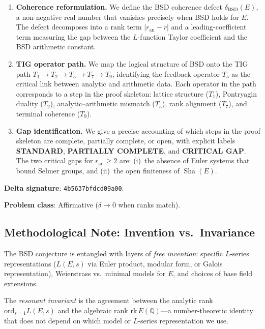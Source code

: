 \documentclass[11pt]{article}
\DeclareMathOperator{\Sha}{Sha}
\begin{document}
\begin{enumerate}
  \item \textbf{Coherence reformulation.}  We define the BSD coherence defect
    $\delta_{\mathrm{BSD}}(E)$, a non-negative real number that vanishes
    precisely when BSD holds for $E$.  The defect decomposes into a rank term
    $|r_{\mathrm{an}} - r|$ and a leading-coefficient term measuring the gap
    between the $L$-function Taylor coefficient and the BSD arithmetic constant.

  \item \textbf{TIG operator path.}  We map the logical structure of BSD onto
    the TIG path $T_1 \to T_2 \to T_5 \to T_7 \to T_9$, identifying the
    feedback operator $T_5$ as the critical link between analytic and arithmetic
    data.  Each operator in the path corresponds to a step in the proof
    skeleton: lattice structure ($T_1$), Pontryagin duality ($T_2$),
    analytic--arithmetic mismatch ($T_5$), rank alignment ($T_7$), and terminal
    coherence ($T_9$).

  \item \textbf{Gap identification.}  We give a precise accounting of which
    steps in the proof skeleton are complete, partially complete, or open, with
    explicit labels \textbf{STANDARD}, \textbf{PARTIALLY COMPLETE}, and
    \textbf{CRITICAL GAP}.  The two critical gaps for $r_{\mathrm{an}} \geq 2$
    are: (i)~the absence of Euler systems that bound Selmer groups, and
    (ii)~the open finiteness of $\Sha(E)$.
\end{enumerate}

\noindent
\textbf{Delta signature}: \texttt{4b5637bfdcd09a00}.

\noindent
\textbf{Problem class}: Affirmative ($\delta \to 0$ when ranks match).

\subsection*{Methodological Note: Invention vs.\ Invariance}

The BSD conjecture is entangled with layers of \emph{free invention}:
specific $L$-series representations ($L(E, s)$ via Euler product, modular form,
or Galois representation), Weierstrass vs.\ minimal models for $E$, and choices
of base field extensions.

The \emph{resonant invariant} is the agreement between the analytic rank
$\text{ord}_{s=1} L(E, s)$ and the algebraic rank $\text{rk}\, E(\mathbb{Q})$---a
number-theoretic identity that does not depend on which model or $L$-series
representation we use.
\end{document}
